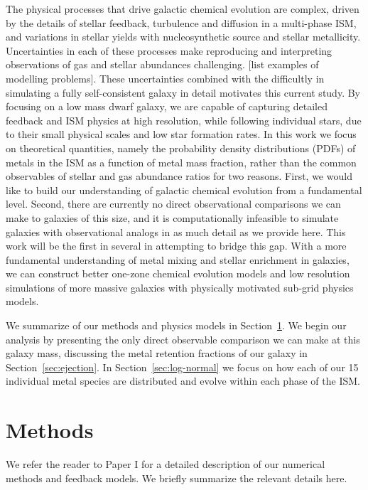 \documentclass[twocolumn]{aastex61}
\begin{document}
The physical processes that drive galactic chemical evolution are complex, driven by the details of stellar feedback, turbulence and diffusion in a multi-phase ISM, and variations in stellar yields with nucleosynthetic source and stellar metallicity. Uncertainties in each of these processes make reproducing and interpreting observations of gas and stellar abundances challenging. [list examples of modelling problems]. These uncertainties combined with the difficultly in simulating a fully self-consistent galaxy in detail motivates this current study. By focusing on a low mass dwarf galaxy, we are capable of capturing detailed feedback and ISM physics at high resolution, while following individual stars, due to their small physical scales and low star formation rates. In this work we focus on theoretical quantities, namely the probability density distributions (PDFs) of metals in the ISM as a function of metal mass fraction, rather than the common observables of stellar and gas abundance ratios for two reasons. First, we would like to build our understanding of galactic chemical evolution from a fundamental level. Second, there are currently no direct observational comparisons we can make to galaxies of this size, and it is computationally infeasible to simulate galaxies with observational analogs in as much detail as we provide here. This work will be the first in several in attempting to bridge this gap. With a more fundamental understanding of metal mixing and stellar enrichment in galaxies, we can construct better one-zone chemical evolution models and low resolution simulations of more massive galaxies with physically motivated sub-grid physics models.

We summarize of our methods and physics models in Section~\ref{sec:methods}. We begin our analysis by presenting the only direct observable comparison we can make at this galaxy mass, discussing the metal retention fractions of our galaxy in Section~\ref{sec:ejection}. In Section~\ref{sec:log-normal} we focus on how each of our 15 individual metal species are distributed and evolve within each phase of the ISM.

\section{Methods}
\label{sec:methods}
We refer the reader to Paper I for a detailed description of our numerical methods and feedback models. We briefly summarize the relevant details here.
\end{document}
